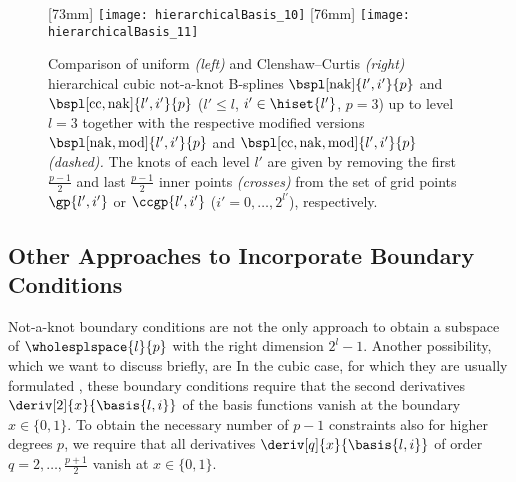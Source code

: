 \begin{figure}
  [73mm]{%
    \texttt{[image: hierarchicalBasis\_10]}%
  }%
  \hfill
  [76mm]{%
    \texttt{[image: hierarchicalBasis\_11]}%
  }%
  \caption[%
    Comparison of hierarchical not-a-knot B-splines%
  ]{%
    Comparison of uniform \emph{(left)} and
    Clenshaw--Curtis \emph{(right)} hierarchical cubic not-a-knot
    B-splines $\bspl[\nak]{l',i'}{p}$ and
    $\bspl[\cc,\nak]{l',i'}{p}$
    ($l ' \le l$, $i' \in \hiset{l'}$, $p = 3$) up to level $l = 3$
    together with the respective modified versions
    $\bspl[\nak,\modified]{l',i'}{p}$ and
    $\bspl[\cc,\nak,\modified]{l',i'}{p}$
    \emph{(dashed).}
    The knots of each level $l'$ are given by removing the
    first $\tfrac{p-1}{2}$ and last $\tfrac{p-1}{2}$
    inner points \emph{(crosses)}
    from the set of grid points $\gp{l',i'}$ or
    $\ccgp{l',i'}$
    ($i' = 0, \dotsc, 2^{l'}$), respectively.%
  }%
  \label{fig:uniformAndClenshawCurtisNotAKnotBSpline}%
\end{figure}



\subsection{Other Approaches to Incorporate Boundary Conditions}
\label{sec:324naturalBoundary}

Not-a-knot boundary conditions are not the only approach
to obtain a subspace of $\wholesplspace{l}{p}$ with the right dimension $2^l - 1$.
Another possibility, which we want to discuss briefly, are
In the cubic case, for which they are usually formulated
\cite{Hoellig13Approximation},
these boundary conditions require that the
second derivatives $\deriv[2]{x}{\basis{l,i}}$ of the
basis functions vanish at the boundary $x \in \{0, 1\}$.
To obtain the necessary number of $p - 1$ constraints also
for higher degrees $p$,
we require that all derivatives
$\deriv[q]{x}{\basis{l,i}}$ of order
$q = 2, \dotsc, \tfrac{p+1}{2}$ vanish at $x \in \{0, 1\}$.

